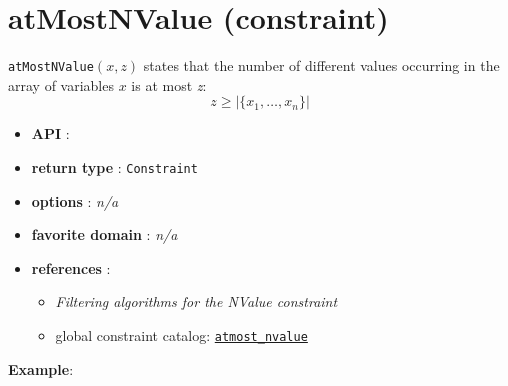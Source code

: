 \label{atmostnvalue}
\hypertarget{atmostnvalue}{}

\section{atMostNValue (constraint)}\label{atmostnvalue:atmostnvalueconstraint}\hypertarget{atmostnvalue:atmostnvalueconstraint}{}
\begin{notedef}
\texttt{atMostNValue}$(x,z)$ states that the number of different values occurring in the array of variables $x$ is at most \emph{z}:
$$z\ge|\{x_1,\ldots,x_n\}|$$  
\end{notedef}

\begin{itemize}
	\item \textbf{API} : 
	\item \textbf{return type} : \texttt{Constraint}
	\item \textbf{options} : \emph{n/a}
	\item \textbf{favorite domain} : \emph{n/a}
	\item \textbf{references} :
      \begin{itemize}
      \item  \cite{BessiereCPAIOR05} \emph{Filtering algorithms for the NValue constraint}
      \item global constraint catalog: \href{http://www.emn.fr/x-info/sdemasse/gccat/Catmost_nvalue.html}{\tt atmost\_nvalue}
      \end{itemize}
    \end{itemize}

\textbf{Example}:

